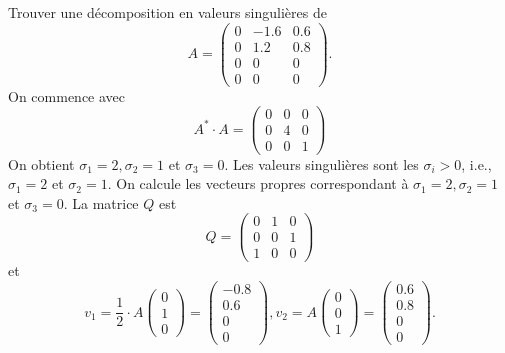 \begin{example}
  \label{exe:19}
  Trouver une décomposition en valeurs singulières de 
  \begin{displaymath}
    A =
    \begin{pmatrix}
      0 & -1.6  & 0.6 \\
      0 & 1.2 & 0.8 \\
      0 & 0 & 0 \\
      0 & 0 & 0
    \end{pmatrix}. 
  \end{displaymath}
On commence avec 
\begin{displaymath}
  A^* \cdot A =
  \begin{pmatrix}
    0 & 0 & 0 \\
    0 & 4 & 0 \\
    0 & 0 & 1
  \end{pmatrix}
\end{displaymath}
On obtient $\sigma_1 = 2, \sigma_2 = 1$ et $\sigma_3 = 0$. Les valeurs singulières sont les $\sigma_i>0$, i.e., $\sigma_1=2$ et $\sigma_2=1$. On calcule les vecteurs propres correspondant à $\sigma_1 = 2, \sigma_2 = 1$ et $\sigma_3 = 0$. La matrice $Q$ est 
\begin{displaymath}
  Q =
  \begin{pmatrix}
    0 & 1 & 0 \\
    0 & 0 & 1  \\
    1 & 0 & 0  
  \end{pmatrix}
\end{displaymath}
et
\begin{displaymath}
v_1 = \frac{1}{2} \cdot   A 
  \begin{pmatrix}
    0\\1\\0
  \end{pmatrix} =
  \begin{pmatrix}
    -0.8 \\ 0.6 \\ 0 \\ 0
  \end{pmatrix}, 
v_2 =  A 
  \begin{pmatrix}
    0\\0\\1
  \end{pmatrix} =
  \begin{pmatrix}
    0.6 \\ 0.8 \\ 0 \\ 0
  \end{pmatrix}.

\end{displaymath}
\end{example}

